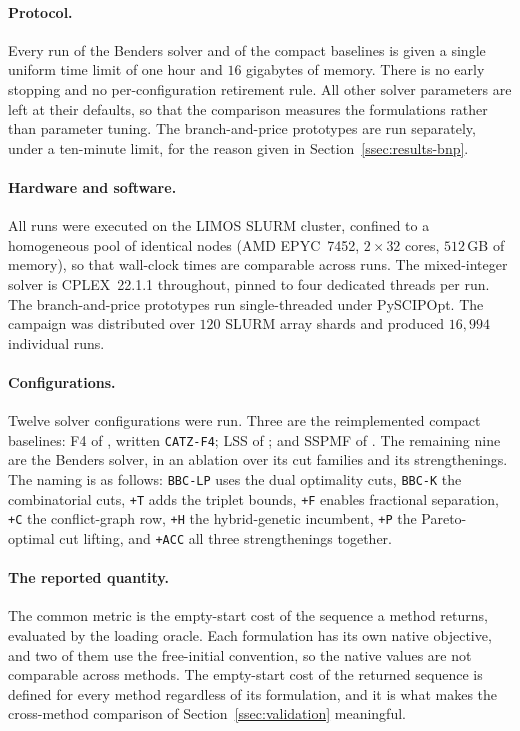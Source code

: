 \paragraph{Protocol.}
Every run of the Benders solver and of the compact baselines is given a single uniform
time limit of one hour and $16$ gigabytes of memory. There is no early stopping and no
per-configuration retirement rule. All other solver parameters are left at their
defaults, so that the comparison measures the formulations rather than parameter
tuning. The branch-and-price prototypes are run separately, under a ten-minute limit,
for the reason given in Section~\ref{ssec:results-bnp}.

\paragraph{Hardware and software.}
All runs were executed on the LIMOS SLURM cluster, confined to a homogeneous pool of
identical nodes (AMD EPYC~7452, $2\times32$ cores, $512$\,GB of memory), so that
wall-clock times are comparable across runs. The mixed-integer solver is CPLEX~22.1.1
throughout, pinned to four dedicated threads per run. The branch-and-price prototypes
run single-threaded under PySCIPOpt. The campaign was distributed over $120$ SLURM
array shards and produced $16{,}994$ individual runs.

\paragraph{Configurations.}
Twelve solver configurations were run. Three are the reimplemented compact baselines:
F4 of \citet{Catanzaro2015}, written \texttt{CATZ-F4}; LSS of \citet{Laporte2004}; and
SSPMF of \citet{daSilva2024}. The remaining nine are the Benders solver, in an ablation
over its cut families and its strengthenings. The naming is as follows:
\texttt{BBC-LP} uses the dual optimality cuts, \texttt{BBC-K} the combinatorial cuts,
\texttt{+T} adds the triplet bounds, \texttt{+F} enables fractional separation,
\texttt{+C} the conflict-graph row, \texttt{+H} the hybrid-genetic incumbent,
\texttt{+P} the Pareto-optimal cut lifting, and \texttt{+ACC} all three strengthenings
together.

\paragraph{The reported quantity.}
The common metric is the empty-start cost of the sequence a method returns, evaluated
by the loading oracle. Each formulation has its own native objective, and two of them
use the free-initial convention, so the native values are not comparable across
methods. The empty-start cost of the returned sequence is defined for every method
regardless of its formulation, and it is what makes the cross-method comparison of
Section~\ref{ssec:validation} meaningful.

